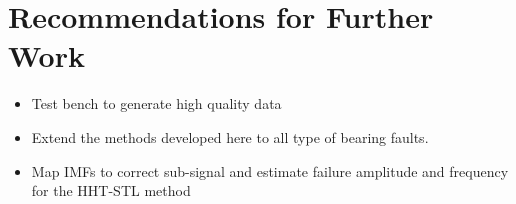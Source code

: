 \documentclass[thesis.tex]{subfiles}
\begin{document}
	\section{Recommendations for Further Work}
	\label{sec:recommendations_for_further_work}
	
	
	\begin{itemize}
		\item Test bench to generate high quality data
		\item Extend the methods developed here to all type of bearing faults.
		\item Map IMFs to correct sub-signal and estimate failure amplitude and frequency for the HHT-STL method
	\end{itemize}
	
\end{document}

